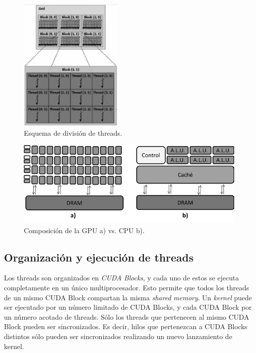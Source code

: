 \begin{figure}
\begin{center}
   \includegraphics[width=5cm]{fig/threads.png}
\end{center}
\caption{\label{fig:threads}Esquema de división de threads.}
\end{figure}

\begin{figure}
\begin{center}
   \includegraphics[width=12cm]{fig/ab.png}
\end{center}
\caption{\label{fig:composicion}Composición de la GPU a) vs. CPU b).}
\end{figure}


\subsection*{Organización y ejecución de threads}

Los threads son organizados en \textit{CUDA Blocks}, y cada uno de estos se ejecuta completamente en un único multiprocesador. Esto permite que todos los threads de un mismo CUDA Block compartan la misma \textit{shared memory}.
Un \textit{kernel} puede ser ejecutado por un número limitado de CUDA Blocks, y cada CUDA Block por un número acotado de threads. Sólo los threads que pertenecen al mismo CUDA Block pueden ser sincronizados. Es decir, hilos que pertenezcan a CUDA Blocks distintos sólo pueden ser sincronizados realizando un nuevo lanzamiento de kernel.

